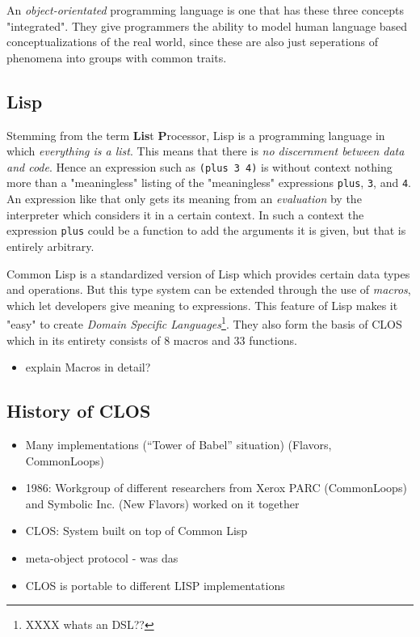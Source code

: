 \documentclass[oribibl]{llncs}
\begin{document}
An \emph{object-orientated} programming language is one that has these three concepts "integrated". They give programmers the ability to model human language based conceptualizations of the real world, since these are also just seperations of phenomena into groups with common traits.

\subsection{Lisp}
\label{sec:lisp}

Stemming from the term \textbf{Lis}t \textbf{P}rocessor, Lisp is a programming language in which \emph{everything is a list}. This means that there is \emph{no discernment between data and code}. Hence an expression such as \texttt{(plus 3 4)} is without context nothing more than a "meaningless" listing of the "meaningless" expressions \texttt{plus}, \texttt{3}, and \texttt{4}. An expression like that only gets its meaning from an \emph{evaluation} by the interpreter which considers it in a certain context. In such a context the expression \texttt{plus} could be a function to add the arguments it is given, but that is entirely arbitrary. 

Common Lisp is a standardized version of Lisp which provides certain data types and operations. But this type system can be extended through the use of \emph{macros}, which let developers give meaning to expressions. This feature of Lisp makes it "easy" to create \emph{Domain Specific Languages}\footnote{XXXX whats an DSL??}. \cite{XXX} They also form the basis of CLOS which in its entirety consists of 8 macros and 33 functions.

\begin{itemize}
\item explain Macros in detail?
\end{itemize}


\subsection{History of CLOS}
\label{sec:history}

\begin{itemize}
\item Many implementations (“Tower of Babel” situation) (Flavors, CommonLoops)
\item 1986: Workgroup of different researchers from Xerox PARC (CommonLoops) and Symbolic Inc. (New Flavors) worked on it together 
\item CLOS: System built on top of Common Lisp
\item meta-object protocol - was das
\item CLOS is portable to different LISP implementations
\end{itemize}
\end{document}
